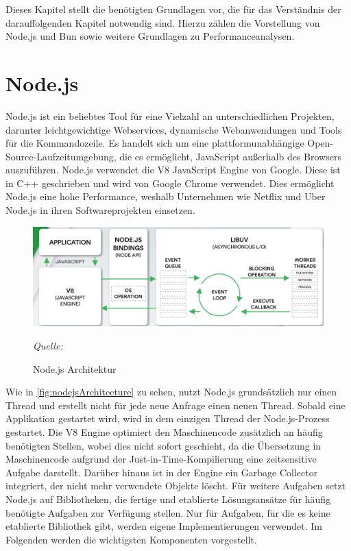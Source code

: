 \label{ch:foundations}
Dieses Kapitel stellt die benötigten Grundlagen vor, die für das Verständnis der darauffolgenden Kapitel notwendig sind. Hierzu zählen die Vorstellung von Node.js und Bun sowie weitere Grundlagen zu Performanceanalysen.

\section{Node.js} \label{sec:foundations-Node.js}
Node.js ist ein beliebtes Tool für eine Vielzahl an unterschiedlichen Projekten, darunter leichtgewichtige Webservices, dynamische Webanwendungen und Tools für die Kommandozeile. Es handelt sich um eine plattformunabhängige Open-Source-Laufzeitumgebung, die es ermöglicht, JavaScript außerhalb des Browsers auszuführen. Node.js verwendet die V8 JavaScript Engine von Google. Diese ist in C++ geschrieben und wird von Google Chrome verwendet. Dies ermöglicht Node.js eine hohe Performance, weshalb Unternehmen wie Netflix und Uber Node.js in ihren Softwareprojekten einsetzen.\cite{OpenJSFoundation.2022}\\

\begin{figure}[h]
	\centering
	\includegraphics[width=\linewidth]{./images/NodeJsArchitecture}
	\caption{Node.js Architektur}
	\label{fig:nodejsArchitecture}
	\textit{Quelle: \cite{Kaneriya.2022}}
\end{figure}
 
\noindent
Wie in \autoref{fig:nodejsArchitecture} zu sehen, nutzt Node.js grundsätzlich nur einen Thread und erstellt nicht für jede neue Anfrage einen neuen Thread. Sobald eine Applikation gestartet wird, wird in dem einzigen Thread der Node.js-Prozess gestartet. Die V8 Engine optimiert den Maschinencode zusätzlich an häufig benötigten Stellen, wobei dies nicht sofort geschieht, da die Übersetzung in Maschinencode aufgrund der Just-in-Time-Kompilierung eine zeitsensitive Aufgabe darstellt. Darüber hinaus ist in der Engine ein Garbage Collector integriert, der nicht mehr verwendete Objekte löscht.\cite{Springer.2022} \newline 
Für weitere Aufgaben setzt Node.js auf Bibliotheken, die fertige und etablierte Lösungsansätze für häufig benötigte Aufgaben zur Verfügung stellen. Nur für Aufgaben, für die es keine etablierte Bibliothek gibt, werden eigene Implementierungen verwendet. Im Folgenden werden die wichtigsten Komponenten vorgestellt.\cite{Springer.2022}\\

